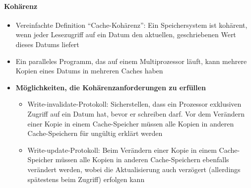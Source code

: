 	\paragraph{Kohärenz}
		\begin{itemize}
			\item Vereinfachte Definition "`Cache-Kohärenz"': Ein Speichersystem ist kohärent, wenn jeder Lesezugriff auf ein Datum den aktuellen, geschriebenen Wert dieses Datums liefert
			\item Ein paralleles Programm, das auf einem Multiprozessor läuft, kann mehrere Kopien eines Datums in mehreren Caches haben
			\item \textbf{Möglichkeiten, die Kohärenzanforderungen zu erfüllen}
			\begin{itemize}
				\item Write-invalidate-Protokoll: Sicherstellen, dass ein Prozessor exklusiven Zugriff auf ein Datum hat, bevor er schreiben darf. Vor dem Verändern einer Kopie in einem Cache-Speicher müssen alle Kopien in anderen Cache-Speichern für ungültig erklärt werden
				\item Write-update-Protokoll: Beim Verändern einer Kopie in einem Cache-Speicher müssen alle Kopien in anderen Cache-Speichern ebenfalls verändert werden, wobei die Aktualisierung auch verzögert (allerdings spätestens beim Zugriff) erfolgen kann
			\end{itemize}
		\end{itemize}

